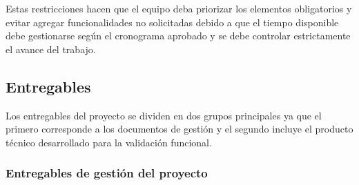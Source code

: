 \documentclass[11pt,spanish]{article}
\begin{document}
Estas restricciones hacen que el equipo deba priorizar los elementos obligatorios y evitar agregar funcionalidades no solicitadas debido a que el tiempo disponible debe gestionarse según el cronograma aprobado y se debe controlar estrictamente el avance del trabajo.

\subsection{Entregables}

Los entregables del proyecto se dividen en dos grupos principales ya que el primero corresponde a los documentos de gestión y el segundo incluye el producto técnico desarrollado para la validación funcional.

\subsubsection{Entregables de gestión del proyecto}
\end{document}
